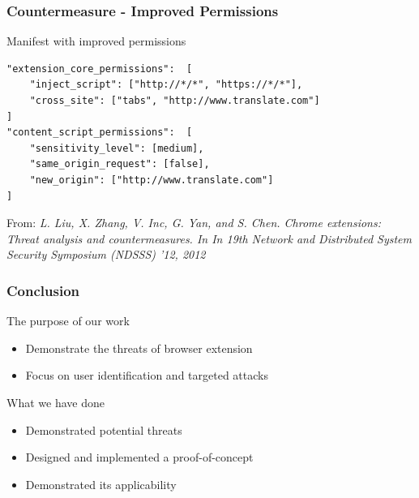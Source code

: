 \documentclass[accentcolor=tud9c,colorbacktitle,xcolor=dvipsnames]{tudbeamer}
\newcommand{\highlight}[4]{%
	\ifnum\value{lstnumber}=#1\color{orange!30}\fi%
	\ifnum\value{lstnumber}=#2\color{orange!30}\fi%
	\ifnum\value{lstnumber}=#3\color{orange!30}\fi%
	\ifnum\value{lstnumber}=#4\color{orange!30}\fi%
}
\begin{document}
\begin{frame}[fragile]
    \frametitle{Countermeasure - Improved Permissions}
    \begin{block}{Manifest with improved permissions}
        \begin{lstlisting}[linebackgroundcolor={\highlight{6}{0}{0}{0}}]
"extension_core_permissions":  [
    "inject_script": ["http://*/*", "https://*/*"],
    "cross_site": ["tabs", "http://www.translate.com"]
]
"content_script_permissions":  [
    "sensitivity_level": [medium],
    "same_origin_request": [false],
    "new_origin": ["http://www.translate.com"]
]
\end{lstlisting} 
    \end{block} 
    \begin{footnotesize}
        From: \textit{L. Liu, X. Zhang, V. Inc, G. Yan, and S. Chen. Chrome extensions: Threat analysis and countermeasures. In In 19th Network and Distributed System Security Symposium (NDSSS) ’12, 2012}
    \end{footnotesize}  
\end{frame}

\begin{frame}
    \frametitle{Conclusion}
    \begin{block}{The purpose of our work}
        \begin{itemize}
            \item Demonstrate the threats of browser extension
            \item Focus on user identification and targeted attacks
        \end{itemize}
    \end{block}
    \begin{block}{What we have done}
        \begin{itemize}
            \item Demonstrated potential threats
            \item Designed and implemented a proof-of-concept
            \item Demonstrated its applicability
        \end{itemize}
    \end{block}
\end{frame}
\end{document}
